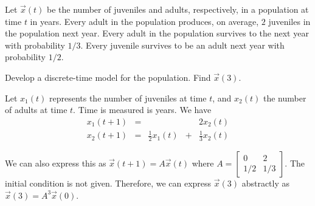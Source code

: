 \documentclass[../main.tex]{subfiles}
\begin{document}
\begin{exercise}
  Let \(\vec{x}(t)\) be the number of juveniles and adults, respectively, in a population at time \(t\) in years. Every adult in the population produces, on average, \(2\) juveniles in the population next year. Every adult in the population survives to the next year with probability \(1/3\). Every juvenile survives to be an adult next year with probability \(1/2\).

  Develop a discrete-time model for the population.  Find \(\vec{x}(3)\).

  \begin{solution}
    Let \(x_{1}(t)\) represents the number of juveniles at time \(t\), and \(x_{2}(t)\) the number of adults at time \(t\).  Time is measured is years.  We have
    \[
      \begin{array}{rcrcrcr}
        x_{1}(t+1) &=&  & & 2 x_{2}(t) \\[2ex]
        x_{2}(t+1) &=& \frac{1}{2}x_{1}(t) &+& \frac{1}{3} x_{2}(t)
      \end{array}
    \]

    We can also express this as \(\vec{x}(t+1) = A \vec{x}(t)\) where \(A = \begin{bmatrix} 0 & 2 \\ 1/2 & 1/3 \end{bmatrix}\).  The initial condition is not given. Therefore, we can express \(\vec{x}(3)\) abstractly as \(\vec{x}(3) = A^{3} \vec{x}(0)\).
  \end{solution}
\end{exercise}
\end{document}
